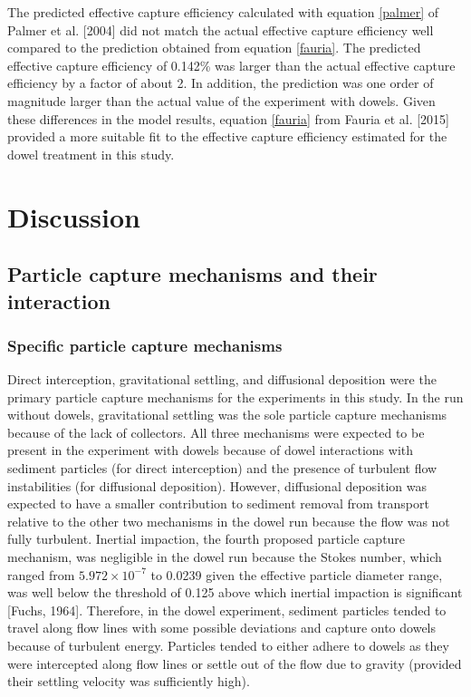 \documentclass[12pt]{article}
\begin{document}
The predicted effective capture efficiency calculated with equation \ref{palmer} of Palmer et al. [2004] did not match the actual effective capture efficiency well compared to the prediction obtained from equation \ref{fauria}. The predicted effective capture efficiency of 0.142\% was larger than the actual effective capture efficiency by a factor of about 2. In addition, the prediction was one order of magnitude larger than the actual value of the experiment with dowels. Given these differences in the model results, equation \ref{fauria} from Fauria et al. [2015] provided a more suitable fit to the effective capture efficiency estimated for the dowel treatment in this study.

\section{Discussion}

\subsection{Particle capture mechanisms and their interaction}

\subsubsection{Specific particle capture mechanisms}

Direct interception, gravitational settling, and diffusional deposition were the primary particle capture mechanisms for the experiments in this study. In the run without dowels, gravitational settling was the sole particle capture mechanisms because of the lack of collectors. All three mechanisms were expected to be present in the experiment with dowels because of dowel interactions with sediment particles (for direct interception) and the presence of turbulent flow instabilities (for diffusional deposition). However, diffusional deposition was expected to have a smaller contribution to sediment removal from transport relative to the other two mechanisms in the dowel run because the flow was not fully turbulent. Inertial impaction, the fourth proposed particle capture mechanism, was negligible in the dowel run because the Stokes number, which ranged from $5.972 \times 10^{-7}$ to 0.0239 given the effective particle diameter range, was well below the threshold of 0.125 above which inertial impaction is significant [Fuchs, 1964]. Therefore, in the dowel experiment, sediment particles tended to travel along flow lines with some possible deviations and capture onto dowels because of turbulent energy. Particles tended to either adhere to dowels as they were intercepted along flow lines or settle out of the flow due to gravity (provided their settling velocity was sufficiently high).
\end{document}
